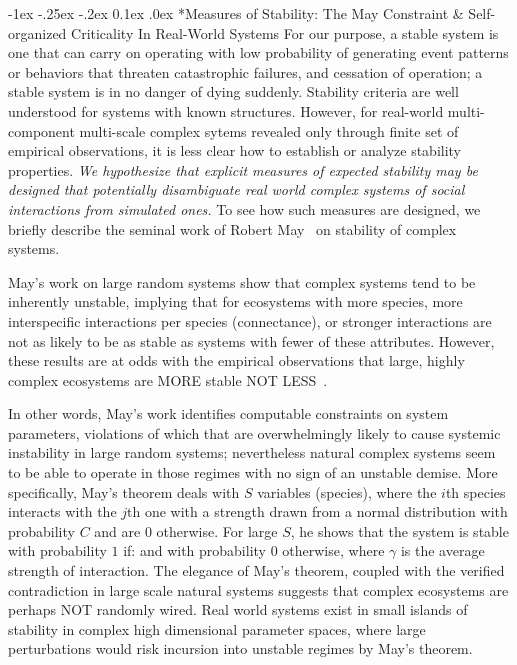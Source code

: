 \documentclass[onecolumn, compsoc,11pt]{IEEEtran}
\makeatletter
\renewcommand\subsection{\@startsection {section}{1}{\z@}%
  {-1ex \@plus -.25ex \@minus -.2ex}%
  {0.1ex \@plus.0ex}%
  {\fontsize{11}{10}\selectfont\bfseries\sffamily\color{DodgerBlue4}}}
\makeatother
\begin{document}
  
\subsection*{Measures of Stability: The May Constraint \& Self-organized Criticality In Real-World Systems}
 For our purpose, a stable system  is one that can carry on operating with low probability of generating event patterns or behaviors that threaten catastrophic failures, and cessation of operation; a stable system  is in no danger of dying suddenly. Stability criteria are well understood for systems with known structures. However, for real-world multi-component multi-scale complex  sytems revealed only  through finite set of empirical observations, it is less clear how to establish or analyze stability properties.  \textit{We hypothesize that explicit  measures of expected stability may be designed that potentially disambiguate real world complex systems of social interactions from simulated ones.} To see how such measures are  designed, we  briefly describe the seminal work of Robert May~\cite{may1972will,may2001stability} on  stability of complex systems.

May's work on  large random systems  show  that  complex systems tend to be inherently unstable, implying that for  ecosystems with more species, more interspecific interactions per species (connectance), or stronger interactions are not as likely to  be as stable as systems with fewer of these attributes. However, these results are at odds with the empirical  observations  that large, highly complex ecosystems are  MORE stable NOT LESS~\cite{jacquet2016no}.

In other words, May's work identifies  computable constraints on system parameters, violations of which  that are overwhelmingly likely to cause systemic instability in large random systems; nevertheless natural complex systems seem to be able to operate in those regimes with no sign of an unstable demise.
%
More specifically, May's theorem deals with  $S$ variables (species), where the $i$th species interacts with the $j$th one with a strength  drawn  from a normal distribution
 with probability $C$ and are $0$ otherwise.
For large $S$, he shows that the system is stable with probability $1$ if:
\noindent and with probability 0 otherwise, where $\gamma$ is the average strength of interaction.
The elegance of May's theorem, coupled with the  verified contradiction in large scale natural systems suggests that  complex ecosystems are perhaps  NOT  randomly wired. Real world  systems exist in small islands of stability in complex high dimensional parameter spaces, where  large perturbations would risk incursion into unstable regimes by  May's theorem.
\end{document}
